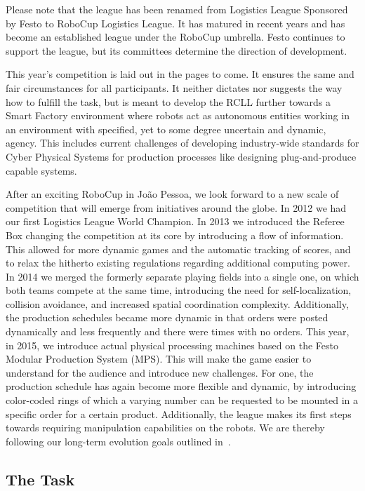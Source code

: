 \documentclass[12pt,twoside]{article}
\begin{document}
Please note that the league has been renamed from Logistics League
Sponsored by Festo to RoboCup Logistics League. It has matured in
recent years and has become an established league under the RoboCup
umbrella. Festo continues to support the league, but its committees
determine the direction of development.

This year's competition is laid out in the pages to come.  It ensures
the same and fair circumstances for all participants. It neither
dictates nor suggests the way how to fulfill the task, but is meant to
develop the RCLL further towards a Smart Factory environment where
robots act as autonomous entities working in an environment with
specified, yet to some degree uncertain and dynamic, agency. This
includes current challenges of developing industry-wide standards for
Cyber Physical Systems for production processes like designing
plug-and-produce capable systems.

After an exciting RoboCup in Jo\~ao Pessoa, we look forward to a new
scale of competition that will emerge from initiatives around the
globe. In 2012 we had our first Logistics League World Champion.  In
2013 we introduced the Referee Box changing the competition at its
core by introducing a flow of information. This allowed for more
dynamic games and the automatic tracking of scores, and to relax the
hitherto existing regulations regarding additional computing power. In
2014 we merged the formerly separate playing fields into a single one,
on which both teams compete at the same time, introducing the need for
self-localization, collision avoidance, and increased spatial
coordination complexity. Additionally, the production schedules became
more dynamic in that orders were posted dynamically and less
frequently and there were times with no orders. This year, in 2015, we
introduce actual physical processing machines based on the Festo
Modular Production System (MPS). This will make the game easier to
understand for the audience and introduce new challenges. For one, the
production schedule has again become more flexible and dynamic, by
introducing color-coded rings of which a varying number can be
requested to be mounted in a specific order for a certain
product. Additionally, the league makes its first steps towards
requiring manipulation capabilities on the robots. We are thereby
following our long-term evolution goals outlined in~\cite{wdrl2013}.

\subsection{The Task}
\label{sec:task}
\end{document}
